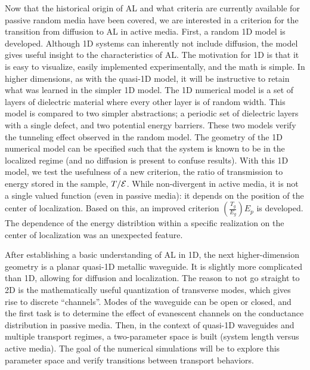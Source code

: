 Now that the historical origin of AL and what criteria are currently available for passive random media have been covered, we are interested in a criterion for the transition from diffusion to AL in active media. First, a random 1D model is developed. Although 1D systems can inherently not include diffusion, the model gives useful insight to the characteristics of AL. The motivation for 1D is that it is easy to visualize, easily implemented experimentally, and the math is simple. In higher dimensions, as with the quasi-1D model, it will be instructive to retain what was learned in the simpler 1D model. The 1D numerical model is a set of layers of dielectric material  where every other layer is of random width. This model is compared to two simpler abstractions; a periodic set of dielectric layers with a single defect, and two potential energy barriers. These two models verify the tunneling effect observed in the random model. The geometry of the 1D numerical model can be specified such that the system is known to be in the localized regime  (and no diffusion is present to confuse results). With this 1D model, we test the usefulness of a new criterion, the ratio of transmission to energy stored in the sample, $T/{\cal E}$. While non-divergent in active media, it is not a single valued function (even in passive media): it depends on the position of the center of localization. Based on this, an improved criterion $\left( \frac{T_g}{E_g}\right)E_p$ is developed. The dependence of the energy distribtion within a specific realization on the center of localization was an unexpected feature. 

After establishing a basic understanding of AL in 1D, the next higher-dimension geometry is a planar quasi-1D metallic waveguide. It is slightly more complicated than 1D, allowing for diffusion and localization. The reason to not go straight to 2D is the mathematically useful quantization of transverse modes, which gives rise to discrete ``channels''. Modes of the waveguide can be open or closed, and the first task is to determine the effect of evanescent channels on the  conductance distribution in passive media. Then, in the context of quasi-1D waveguides and multiple transport regimes, a two-parameter space is built (system length versus active media). The goal of the numerical simulations will be to explore this parameter space and verify transitions between transport behaviors.

